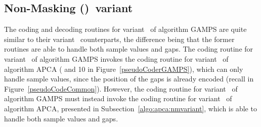 \subsection{Non-Masking (\NOmaskalgo)\ variant}
\label{algo:gamps:nmvariant}


The coding and decoding routines for variant \NOmaskalgo\ of algorithm GAMPS are quite similar to their variant \maskalgo\ counterparts, the difference being that the former routines are able to handle both sample values and gaps. The coding routine for variant \maskalgo\ of algorithm GAMPS invokes the coding routine for variant \maskalgo\ of algorithm APCA ( and 10 in Figure~\ref{pseudoCoderGAMPS}), which can only handle sample values, since the position of the gaps is already encoded (recall  in Figure~\ref{pseudoCodeCommon}). However, the coding routine for variant \NOmaskalgo\ of algorithm GAMPS must instead invoke the coding routine for variant \NOmaskalgo\ of algorithm APCA, presented in Subsection~\ref{algo:apca:nmvariant}, which is able to handle both sample values and gaps.


